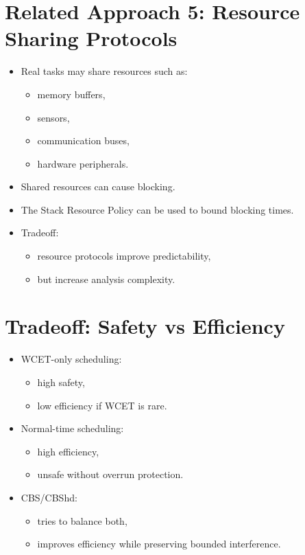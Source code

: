 \documentclass[a4paper,11pt]{article}
\begin{document}
\section*{Related Approach 5: Resource Sharing Protocols}

\begin{itemize}
    \item Real tasks may share resources such as:
    \begin{itemize}
        \item memory buffers,
        \item sensors,
        \item communication buses,
        \item hardware peripherals.
    \end{itemize}
    \item Shared resources can cause blocking.
    \item The Stack Resource Policy can be used to bound blocking times.
    \item Tradeoff:
    \begin{itemize}
        \item resource protocols improve predictability,
        \item but increase analysis complexity.
    \end{itemize}
\end{itemize}

\section*{Tradeoff: Safety vs Efficiency}

\begin{itemize}
    \item WCET-only scheduling:
    \begin{itemize}
        \item high safety,
        \item low efficiency if WCET is rare.
    \end{itemize}
    \item Normal-time scheduling:
    \begin{itemize}
        \item high efficiency,
        \item unsafe without overrun protection.
    \end{itemize}
    \item CBS/CBShd:
    \begin{itemize}
        \item tries to balance both,
        \item improves efficiency while preserving bounded interference.
    \end{itemize}
\end{itemize}
\end{document}
